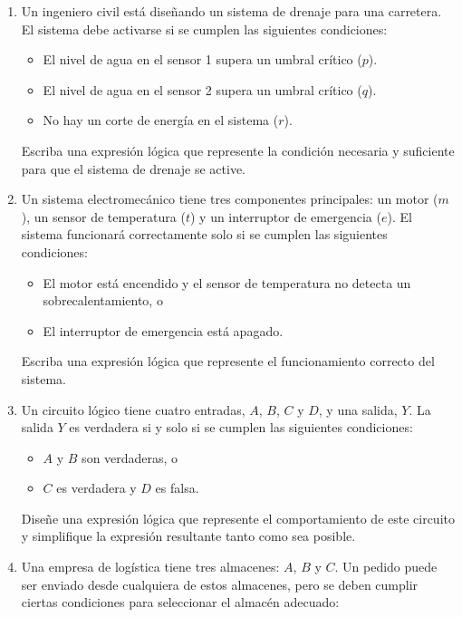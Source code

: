 \begin{enumerate}[label=\textbf{\arabic*}.]
	\item Un ingeniero civil está diseñando un sistema de drenaje para una carretera. El sistema debe activarse si se cumplen las siguientes condiciones:
	\begin{itemize}[itemsep=-3pt]
		\item El nivel de agua en el sensor 1 supera un umbral crítico ($p$).
		\item El nivel de agua en el sensor 2 supera un umbral crítico ($q$).
		\item No hay un corte de energía en el sistema ($r$).
	\end{itemize}
	
	Escriba una expresión lógica que represente la condición necesaria y suficiente para que el sistema de drenaje se active.
	
	\item Un sistema electromecánico tiene tres componentes principales: un motor ($m$), un sensor de temperatura ($t$) y un interruptor de emergencia ($e$). El sistema funcionará correctamente solo si se cumplen las siguientes condiciones:
	
	\begin{itemize}[itemsep=-3pt]
		\item El motor está encendido y el sensor de temperatura no detecta un sobrecalentamiento, o
		\item El interruptor de emergencia está apagado.
	\end{itemize}
	
	Escriba una expresión lógica que represente el funcionamiento correcto del sistema.
	
	\item Un circuito lógico tiene cuatro entradas, $A$, $B$, $C$ y $D$, y una salida, $Y$. La salida $Y$ es verdadera si y solo si se cumplen las siguientes condiciones:
	
	\begin{itemize}[itemsep=-3pt]
		\item $A$ y $B$ son verdaderas, o
		\item $C$ es verdadera y $D$ es falsa.
	\end{itemize}
	
	Diseñe una expresión lógica que represente el comportamiento de este circuito y simplifique la expresión resultante tanto como sea posible.
	
	\item Una empresa de logística tiene tres almacenes: $A$, $B$ y $C$. Un pedido puede ser enviado desde cualquiera de estos almacenes, pero se deben cumplir ciertas condiciones para seleccionar el almacén adecuado:
	

\end{enumerate}
